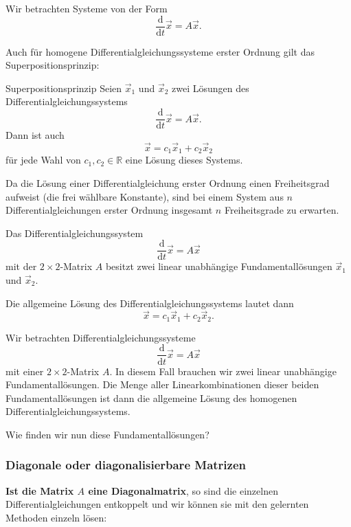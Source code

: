 Wir betrachten Systeme von der Form
\[
    \frac{\mathrm{d}}{\mathrm{d}t}\vec{x}=A\vec{x}.
\]

Auch für homogene Differentialgleichungssysteme erster Ordnung gilt das Superpositionsprinzip:

\begin{satz}{Superpositionsprinzip}{}
    Seien \(\vec{x}_1\) und \(\vec{x}_2\) zwei Lösungen des Differentialgleichungssystems
    \[
        \frac{\mathrm{d}}{\mathrm{d}t}\vec{x}=A\vec{x}.
    \]
    Dann ist auch
    \[
        \vec{x}=c_1\vec{x}_1+c_2\vec{x}_2
    \]
    für jede Wahl von \(c_1,c_2\in\mathbb{R}\) eine Lösung dieses Systems.
\end{satz}

Da die Lösung einer Differentialgleichung erster Ordnung einen Freiheitsgrad aufweist (die frei wählbare Konstante), sind bei einem System aus \(n\) Differentialgleichungen erster Ordnung insgesamt \(n\) Freiheitsgrade zu erwarten.

\begin{satz}{}{}
    Das Differentialgleichungssystem
    \[
        \frac{\mathrm{d}}{\mathrm{d}t}\vec{x}=A\vec{x}
    \]
    mit der \(2\times 2\)-Matrix \(A\) besitzt zwei linear unabhängige Fundamentallösungen \(\vec{x}_1\) und \(\vec{x}_2\).

    Die allgemeine Lösung des Differentialgleichungssystems lautet dann
    \[
        \vec{x}=c_1\vec{x}_1+c_2\vec{x}_2.
    \]
\end{satz}

Wir betrachten Differentialgleichungssysteme
\[
    \frac{\mathrm{d}}{\mathrm{d}t}\vec{x}=A\vec{x}
\]
mit einer \(2\times 2\)-Matrix \(A\). In diesem Fall brauchen wir zwei linear unabhängige Fundamentallösungen. Die Menge aller Linearkombinationen dieser beiden Fundamentallösungen ist dann die allgemeine Lösung des homogenen Differentialgleichungssystems.

Wie finden wir nun diese Fundamentallösungen?



\subsubsection{Diagonale oder diagonalisierbare Matrizen}

\textbf{Ist die Matrix \(A\) eine Diagonalmatrix}, so sind die einzelnen Differentialgleichungen entkoppelt und wir können sie mit den gelernten Methoden einzeln lösen:

